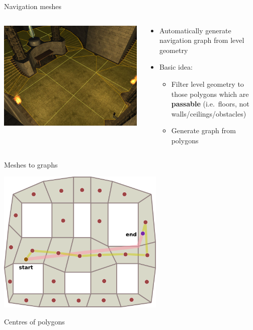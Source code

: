 \begin{frame}{Navigation meshes}
	\begin{columns}
		\begin{column}{0.4\textwidth}
			\includegraphics[width=\textwidth]{navmesh} %
		\end{column}
		\begin{column}{0.58\textwidth}
			\begin{itemize}
				\pause\item Automatically generate navigation graph from level geometry
				\pause\item Basic idea:
					\begin{itemize}
						\pause\item Filter level geometry to those polygons which are \textbf{passable}
							(i.e.\ floors, not walls/ceilings/obstacles)
						\pause\item Generate graph from polygons
					\end{itemize}
			\end{itemize}
		\end{column}
	\end{columns}
\end{frame}

\begin{frame}{Meshes to graphs}
	\begin{center}
		\includegraphics[width=0.6\textwidth]{polygon-navmesh-faces}
		
		Centres of polygons
	\end{center}
\end{frame}

